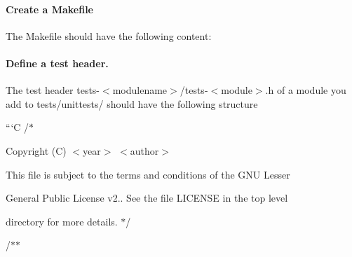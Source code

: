 \paragraph*{Create a Makefile}

The Makefile should have the following content\+:




\paragraph*{Define a test header.}

The test header {\ttfamily tests-\/$<$modulename$>$/tests-\/$<$module$>$.h} of a module you add to {\ttfamily tests/unittests/} should have the following structure

```C /$\ast$
\begin{DoxyItemize}
\item Copyright (C) $<$year$>$ $<$author$>$
\item 
\item This file is subject to the terms and conditions of the G\+NU Lesser
\item General Public License v2.. See the file L\+I\+C\+E\+N\+SE in the top level
\item directory for more details. $\ast$/
\end{DoxyItemize}

/$\ast$$\ast$
\begin{DoxyItemize}
\item 
\end{DoxyItemize}